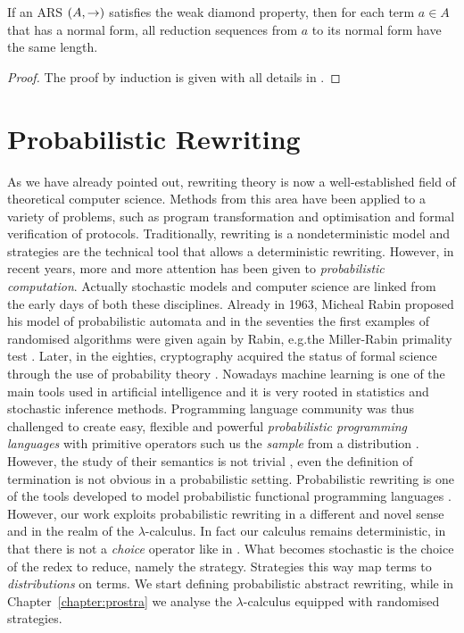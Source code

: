 \begin{lemma}[]\label{lemma:weak}
	If an ARS $(A,\rightarrow)$ satisfies the weak diamond property, then for each term $a\in A$ that has a normal form, all reduction sequences from $a$ to its normal form have the same length.
\end{lemma}
\begin{proof}
	The proof by induction is given with all details in \cite{dal_lago_invariant_2005}.
\end{proof}
\section{Probabilistic Rewriting}
As we have already pointed out, rewriting theory is now a well-established field of theoretical computer science. Methods from this area have been applied to a variety of problems, such as program transformation and optimisation and formal verification of protocols. Traditionally, rewriting is a nondeterministic model and strategies are the technical tool that allows a deterministic rewriting. However, in recent years, more and more attention has been given to \emph{probabilistic computation}. Actually stochastic models and computer science are linked from the early days of both these disciplines. Already in 1963, Micheal Rabin proposed his model of probabilistic automata \cite{rabin_probabilistic_1963} and in the seventies the first examples of randomised algorithms were given again by Rabin, e.g.the Miller-Rabin primality test \cite{rabin_probabilistic_1980}. Later, in the eighties, cryptography acquired the status of formal science through the use of probability theory \cite{goldreich_how_1984}. Nowadays machine learning is one of the main tools used in artificial intelligence and it is very rooted in statistics and stochastic inference methods. Programming language community was thus challenged to create easy, flexible and powerful \emph{probabilistic programming languages} with primitive operators such us the \emph{sample} from a distribution \cite{goodman_church:_2008,wood_new_2014}. However, the study of their semantics is not trivial \cite{staton_semantics_2016}, even the definition of termination is not obvious in a probabilistic setting. Probabilistic rewriting is one of the tools developed to model  probabilistic functional programming languages \cite{avanzini_probabilistic_2018}. However, our work exploits probabilistic rewriting in a different and novel sense and in the realm of the $\lambda$-calculus. In fact our calculus remains deterministic, in that there is not a \emph{choice} operator like in \cite{borgstrom_lambda-calculus_2016}. What becomes stochastic is the choice of the redex to reduce, namely the strategy. Strategies this way map terms to \emph{distributions} on terms. We start defining probabilistic abstract rewriting, while in Chapter~\ref{chapter:prostra} we analyse the $\lambda$-calculus equipped with randomised strategies.
